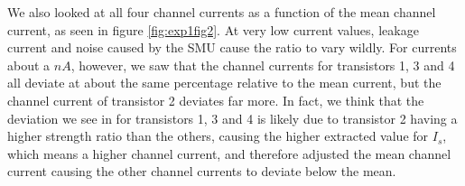 We also looked at all four channel currents as a function of the mean channel current, as seen in figure \ref{fig:exp1fig2}. At very low current values, leakage current and noise caused by the SMU cause the ratio to vary wildly. For currents about a $nA$, however, we saw that the channel currents for transistors 1, 3 and 4 all deviate at about the same percentage relative to the mean current, but the channel current of transistor 2 deviates far more. In fact, we think that the deviation we see in for transistors 1, 3 and 4 is likely due to transistor 2 having a higher strength ratio than the others, causing the higher extracted value for $I_s$, which means a higher channel current, and therefore adjusted the mean channel current causing the other channel currents to deviate below the mean.
